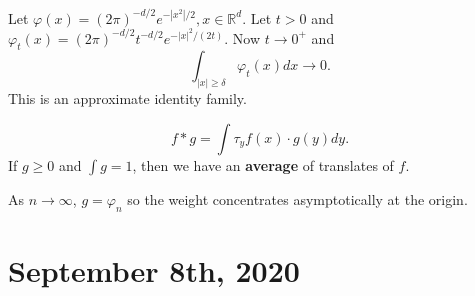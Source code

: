 \documentclass[11pt]{scrartcl}
\newcommand{\R}{\mathbb{R}}
\let \phi \varphi
\newcommand{\<}{\langle}
\renewcommand{\>}{\rangle}
\begin{document}
\begin{example} Let $\phi(x) = (2\pi)^{-d/2}e^{-|x^2|/2}, x \in \R^d$.  Let $t > 0$ and $\phi_t(x) = (2\pi)^{-d/2} t^{-d/2} e^{-|x|^2/(2t)}$.  Now $t \rightarrow 0^+$ and 
$$\int_{|x|\ge \delta} \phi_t(x)dx \rightarrow 0.$$ 
This is an approximate identity family.
\end{example}
\begin{example}[Interpretation of $f*g$]
$$f * g = \int \tau_y f(x) \cdot g(y)dy.$$
If $g \ge 0$ and $\int g = 1$, then we have an \textbf{average} of translates of $f$.

As $n \rightarrow \infty$, $g = \phi_n$ so the weight concentrates asymptotically at the origin.
\end{example}
\pagebreak
\section{September 8th, 2020}
\end{document}
